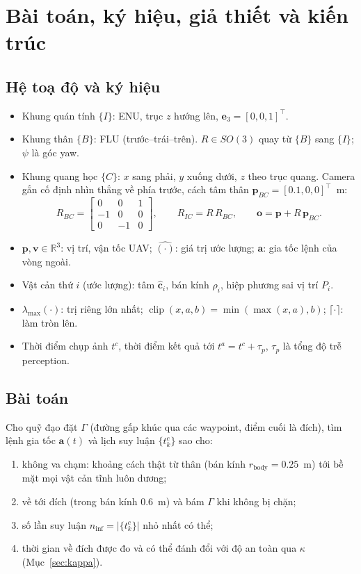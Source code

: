 \documentclass[11pt,a4paper]{article}
\numberwithin{equation}{section}
\newcommand{\R}{\mathbb{R}}
\newcommand{\vb}[1]{\bm{#1}}
\newcommand{\T}{^{\!\top}}
\newcommand{\clip}{\operatorname{clip}}
\newcommand{\lmax}{\lambda_{\max}}
\theoremstyle{definition}
\theoremstyle{plain}
\theoremstyle{remark}
\begin{document}
\section{Bài toán, ký hiệu, giả thiết và kiến trúc}
\label{sec:problem}

\subsection{Hệ toạ độ và ký hiệu}
\begin{itemize}
\item Khung quán tính $\{I\}$: ENU, trục $z$ hướng lên, $\vb e_3=[0,0,1]\T$.
\item Khung thân $\{B\}$: FLU (trước--trái--trên). $R\in SO(3)$ quay từ $\{B\}$ sang $\{I\}$; $\psi$ là góc yaw.
\item Khung quang học $\{C\}$: $x$ sang phải, $y$ xuống dưới, $z$ theo trục quang. Camera gắn cố định nhìn thẳng về phía trước, cách tâm thân $\vb p_{BC}=[0.1,0,0]\T$~m:
\begin{equation}
R_{BC}=\begin{bmatrix}0&0&1\\-1&0&0\\0&-1&0\end{bmatrix},\qquad R_{IC}=R\,R_{BC},\qquad \vb o=\vb p+R\,\vb p_{BC}. \label{eq:frames}
\end{equation}
\item $\vb p,\vb v\in\R^3$: vị trí, vận tốc UAV; $\hat{(\cdot)}$: giá trị ước lượng; $\vb a$: gia tốc lệnh của vòng ngoài.
\item Vật cản thứ $i$ (ước lượng): tâm $\hat{\vb c}_i$, bán kính $\rho_i$, hiệp phương sai vị trí $P_i$.
\item $\lmax(\cdot)$: trị riêng lớn nhất; $\clip(x,a,b)=\min(\max(x,a),b)$; $\lceil\cdot\rceil$: làm tròn lên.
\item Thời điểm chụp ảnh $t^c$, thời điểm kết quả tới $t^a=t^c+\tau_p$, $\tau_p$ là tổng độ trễ perception.
\end{itemize}

\subsection{Bài toán}
Cho quỹ đạo đặt $\Gamma$ (đường gấp khúc qua các waypoint, điểm cuối là đích), tìm lệnh gia tốc $\vb a(t)$ và lịch suy luận $\{t^c_k\}$ sao cho:
\begin{enumerate}[label=(\roman*)]
\item không va chạm: khoảng cách thật từ thân (bán kính $r_{\text{body}}=0.25$~m) tới bề mặt mọi vật cản tĩnh luôn dương;
\item về tới đích (trong bán kính 0.6~m) và bám $\Gamma$ khi không bị chặn;
\item số lần suy luận $n_{\text{inf}}=|\{t^c_k\}|$ nhỏ nhất có thể;
\item thời gian về đích được đo và có thể đánh đổi với độ an toàn qua $\kappa$ (Mục~\ref{sec:kappa}).
\end{enumerate}
\end{document}
